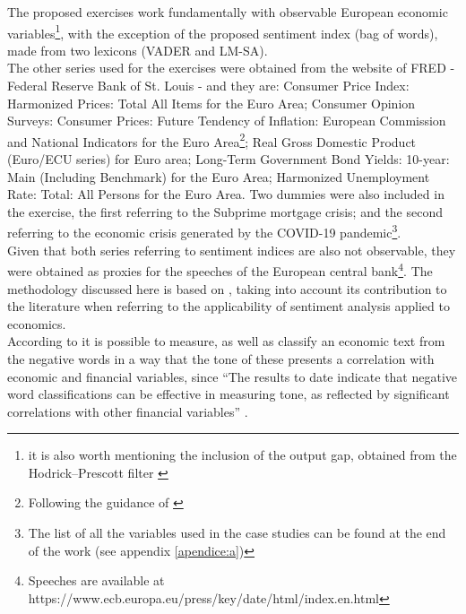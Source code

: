 The proposed exercises work fundamentally with observable European economic variables\footnote{it is also worth mentioning the inclusion of the output gap, obtained from the Hodrick–Prescott filter \citep{hodrick1997postwar}}, with the exception of the proposed sentiment index (bag of words), made from two lexicons (VADER and LM-SA).\\

The other series used for the exercises were obtained from the website of FRED - Federal Reserve Bank of St. Louis - and they are: Consumer Price Index: Harmonized Prices: Total All Items for the Euro Area; Consumer Opinion Surveys: Consumer Prices: Future Tendency of Inflation: European Commission and National Indicators for the Euro Area\footnote{Following the guidance of \cite{shapiro2020measuring}}; Real Gross Domestic Product (Euro/ECU series) for Euro area; Long-Term Government Bond Yields: 10-year: Main (Including Benchmark) for the Euro Area; Harmonized Unemployment Rate: Total: All Persons for the Euro Area. Two dummies were also included in the exercise, the first referring to the Subprime mortgage crisis; and the second referring to the economic crisis generated by the COVID-19 pandemic\footnote{The list of all the variables used in the case studies can be found at the end of the work (see appendix \ref{apendice:a})}.\\


Given that both series referring to sentiment indices are also not observable, they were obtained as proxies for the speeches of the European central bank\footnote{Speeches are available at https://www.ecb.europa.eu/press/key/date/html/index.en.html}. The methodology discussed here is based on \cite{loughran2011liability}, taking into account its contribution to the literature when referring to the applicability of sentiment analysis applied to economics.\\

According to \cite{loughran2011liability} it is possible to measure, as well as classify an economic text from the negative words in a way that the tone of these presents a correlation with economic and financial variables, since ``The results to date indicate that negative word classifications can be effective in measuring tone, as reflected by significant correlations with other financial variables'' \cite[p. 35]{loughran2011liability}.\\

